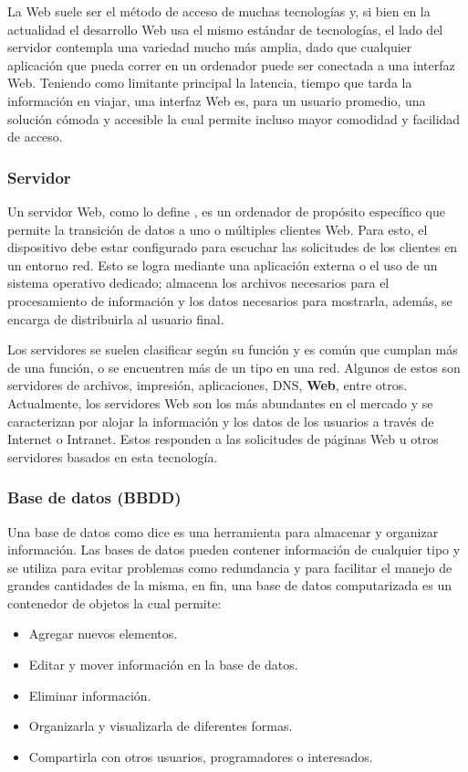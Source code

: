 La Web suele ser el método de acceso de muchas tecnologías y, si bien en la actualidad
el desarrollo Web usa el mismo estándar de tecnologías, el lado del servidor
contempla una variedad mucho más amplia, dado que cualquier aplicación que
pueda correr en un ordenador puede ser conectada a una interfaz Web. Teniendo
como limitante principal la latencia,  tiempo que tarda la información en viajar,
una interfaz Web es, para un usuario promedio, una solución cómoda y
accesible la cual  permite incluso  mayor comodidad y facilidad de acceso.


\subsubsection*{Servidor}

Un servidor Web, como lo define \textcite{servidor},  es un ordenador de propósito
específico que permite la
transición de datos a uno o múltiples clientes Web. Para esto, el dispositivo
debe estar configurado para escuchar las solicitudes de los clientes en un
entorno red. Esto se logra mediante una aplicación externa o el uso de un
sistema operativo dedicado; almacena los archivos
necesarios para el procesamiento de información y los datos necesarios para
mostrarla, además, se encarga de distribuirla al usuario final.

Los servidores se suelen clasificar según su función y es común que cumplan más
de una función, o se encuentren más de un tipo en una red. Algunos de estos son
servidores de archivos, impresión, aplicaciones, DNS, \textbf{Web}, entre otros.
Actualmente, los servidores Web son los más abundantes en el mercado
y se caracterizan por alojar la información y los datos de los usuarios a través
de Internet o Intranet. Estos responden a las solicitudes de páginas Web u otros
servidores basados en esta tecnología.

\subsubsection{Base de datos (BBDD)}
Una base de datos como dice \textcite{bbdd} es una herramienta para almacenar y
organizar información.
Las bases de datos pueden contener información de cualquier tipo
y se utiliza para evitar problemas como redundancia y para facilitar el manejo de
grandes cantidades de la misma, en fin,  una base de datos
computarizada es un contenedor de objetos la cual permite:

\begin{itemize}
    \item Agregar nuevos elementos.
    \item Editar y mover información en la base de datos.
    \item Eliminar información.
    \item Organizarla y visualizarla de diferentes formas.
    \item Compartirla con otros usuarios, programadores o interesados.
\end{itemize}

